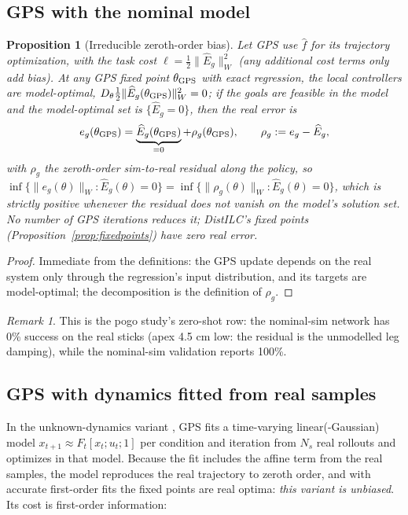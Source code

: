 \documentclass[11pt]{article}
\newtheorem{proposition}[theorem]{Proposition}
\theoremstyle{definition}
\theoremstyle{remark}
\newtheorem{remark}[theorem]{Remark}
\newcommand{\nW}[1]{\lVert #1\rVert_W}
\newcommand{\fhat}{\widehat f}
\newcommand{\Ehat}{\widehat E}
\begin{document}
\subsection{GPS with the nominal model}
\begin{proposition}[Irreducible zeroth-order bias]\label{prop:gpsnominal}
Let GPS use $\fhat$ for its trajectory optimization, with the task cost $\ell=\tfrac12\nW{\Ehat_g}^2$ (any additional
cost terms only add bias). At any GPS fixed point $\theta_{\rm GPS}$ with exact regression, the local controllers are
model-optimal, $D_\theta\tfrac12\nW{\Ehat_g(\theta_{\rm GPS})}^2=0$; if the goals are feasible in the model and the
model-optimal set is $\{\Ehat_g=0\}$, then the real error is
\[e_g(\theta_{\rm GPS})=\underbrace{\Ehat_g(\theta_{\rm GPS})}_{=0}+\rho_g(\theta_{\rm GPS}),\qquad
\rho_g:=e_g-\Ehat_g,\]
with $\rho_g$ the zeroth-order sim-to-real residual along the policy,
so $\inf\{\nW{e_g(\theta)}:\Ehat_g(\theta)=0\}=\inf\{\nW{\rho_g(\theta)}:\Ehat_g(\theta)=0\}$, which is strictly positive
whenever the residual does not vanish on the model's solution set. No number of GPS iterations reduces it; DistILC's
fixed points (Proposition~\ref{prop:fixedpoints}) have zero real error.
\end{proposition}
\begin{proof}
Immediate from the definitions: the GPS update depends on the real system only through the regression's input
distribution, and its targets are model-optimal; the decomposition is the definition of $\rho_g$.
\end{proof}
\begin{remark}
This is the pogo study's zero-shot row: the nominal-sim network has 0\% success on the real sticks (apex 4.5 cm low:
the residual is the unmodelled leg damping), while the nominal-sim validation reports 100\%.
\end{remark}

\subsection{GPS with dynamics fitted from real samples}
In the unknown-dynamics variant \cite{levine2014unknown}, GPS fits a time-varying linear(-Gaussian) model
$x_{t+1}\approx F_t[x_t;u_t;1]$ per condition and iteration from $N_s$ real rollouts and optimizes in that model.
Because the fit includes the affine term from the real samples, the model reproduces the real trajectory to zeroth order,
and with accurate first-order fits the fixed points are real optima: \emph{this variant is unbiased}. Its cost is
first-order information:
\end{document}
